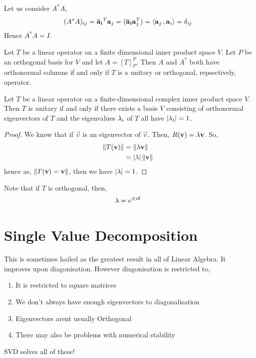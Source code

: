 \documentclass{article}
\begin{document}
Let us consider $A^*A$,
$$ (A^*A)_{ij} = \boldsymbol{\mathbf{\overline{a}_i}}^T\boldsymbol{\mathbf{a}}_j = (\boldsymbol{\mathbf{\overline{a}_i}}\boldsymbol{\mathbf{a}}_j^T) = \left\langle \boldsymbol{\mathbf{a}}_j\,, \boldsymbol{\mathbf{a}}_i \right\rangle = \delta_{ij} $$
Hence $A^*A = I$.

\begin{ncor}
  Let $T$ be a linear operator on a finite dimensional inner product space $V$. Let $P$ be an orthogonal basis for $V$ and let $A = [T]_P^P$. Then $A$ and $A^*$ both have orthonormal columns if and only if $T$ is a unitary or orthogonal, repsectively, operator.
\end{ncor}

\begin{nthm}
  Let $T$ be a linear operator on a finite-dimensional complex inner product space $V$. Then $T$ is unitary if and only if there exists a basis $V$ consisting of orthonormal eigenvectors of $T$ and the eigenvalues $\lambda_i$ of $T$ all have $|\lambda_i| = 1$.
\end{nthm}

\begin{proof}
  We know that if $\vec v$ is an eigenvector of $\vec v$. Then, $R(\boldsymbol{\mathbf{v}}) = \lambda \boldsymbol{\mathbf{v}}$. So,
  \begin{align*}
    \left\lVert T(\boldsymbol{\mathbf{v}})\right\rVert &= \left\lVert \lambda \boldsymbol{\mathbf{v}}\right\rVert\\
    &= |\lambda|\left\lVert \boldsymbol{\mathbf{v}}\right\rVert
  \end{align*}
  hence as, $\left\lVert T(\boldsymbol{\mathbf{v}}) = \boldsymbol{\mathbf{v}}\right\rVert$, then we have $|\lambda| = 1$.
\end{proof}

Note that if $T$ is orthogonal, then,
$$ \lambda = e^{\pm i \theta} $$

\section{Single Value Decomposition}
This is sometimes hailed as the greatest result in all of Linear Algebra. It improves upon diagonisation. However diagonisation is restricted to,
\begin{enumerate}
  \item It is restricted to square matrices
  \item We don't always have enough eigenvectors to diagonalisation
  \item Eigenvectors arent usually Orthogonal
  \item There may also be problems with numerical stability
\end{enumerate}
SVD solves all of these!\\
\end{document}
